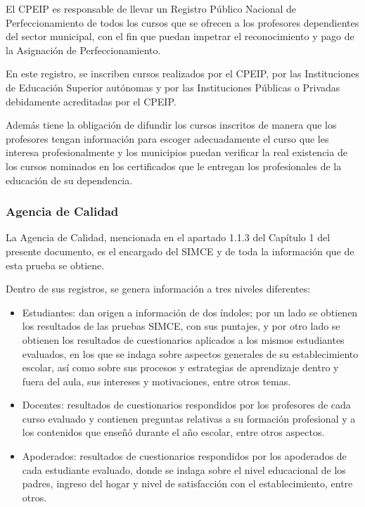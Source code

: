 \begin{longdescription}
    El CPEIP es responsable de llevar un Registro Público Nacional de Perfeccionamiento de todos los cursos que se ofrecen a los profesores dependientes del sector municipal, con el fin que puedan impetrar el reconocimiento y pago de la Asignación de Perfeccionamiento.
    
    En este registro, se inscriben cursos realizados por el CPEIP, por las Instituciones de Educación Superior autónomas y por las Instituciones Públicas o Privadas debidamente acreditadas por el CPEIP.
    
    Además tiene la obligación de difundir los cursos inscritos de manera que los profesores tengan información para escoger adecuadamente el curso que les interesa profesionalmente y los municipios puedan verificar la real existencia de los cursos nominados en los certificados que le entregan los profesionales de la educación de su dependencia.
\end{longdescription}

\subsubsection{Agencia de Calidad}
La Agencia de Calidad, mencionada en el apartado 1.1.3 del Capítulo 1 del presente documento, es el encargado del SIMCE y de toda la información que de esta prueba se obtiene. 

Dentro de sus registros, se genera información a tres niveles diferentes: 
\begin{itemize}
\item Estudiantes: dan origen a información de dos índoles; por un lado se obtienen los resultados de las pruebas SIMCE, con sus puntajes, y por otro lado se obtienen los resultados de cuestionarios aplicados a los mismos estudiantes evaluados, en los que se indaga sobre aspectos generales de su establecimiento escolar, así como sobre sus procesos y estrategias de aprendizaje dentro y fuera del aula, sus intereses y motivaciones, entre otros temas.
\item Docentes: resultados de cuestionarios respondidos por los profesores de cada curso evaluado y contienen preguntas relativas a su formación profesional y a los contenidos que enseñó durante el año escolar, entre otros aspectos.
\item Apoderados: resultados de cuestionarios respondidos por los apoderados de cada estudiante evaluado, donde se indaga sobre el nivel educacional de los padres, ingreso del hogar y nivel de satisfacción con el establecimiento, entre otros.
\end{itemize}

